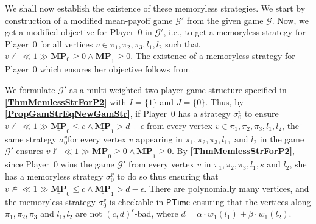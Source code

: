 We shall now establish the existence of these memoryless strategies. 
We start by construction of a modified mean-payoff game $\mathcal{G'}$ from the given game $\mathcal{G}$. Now, we get a modified objective for Player~0 in $\mathcal{G'}$, i.e., to get a memoryless strategy for Player~0 for all vertices $v \in \pi_1, \pi_2, \pi_3, l_1, l_2$ such that $v \nvDash \ll 1 \gg \overline{\mathbf{MP}}_0 \geqslant 0 \land \underline{\mathbf{MP}}_1 \geqslant 0$. The existence of a memoryless strategy for Player~0 which ensures her objective follows from \textbf{}

\noindent We formulate $\mathcal{G'}$ as a multi-weighted two-player game structure specified in \textbf{\cref{ThmMemlessStrForP2}} with $I = \{1\}$ and $J = \{0\}$. 
Thus, by \textbf{\cref{PropGamStrEqNewGamStr}}, if Player~0 has a strategy $\sigma_0^{v}$ to ensure $v \nvDash \ll 1 \gg \underline{\mathbf{MP}}_0 \leqslant c \land \underline{\mathbf{MP}}_1 > d-\epsilon$ from every vertex $v \in \pi_1, \pi_2, \pi_3, l_1, l_2$, the same strategy $\sigma_0^{v}$for every vertex $v$ appearing in $\pi_1, \pi_2, \pi_3, l_1, \text{ and } l_2$ in the game $\mathcal{G'}$ ensures $v \nvDash \ll 1 \gg \underline{\mathbf{MP}}_0 \geqslant 0 \land \underline{\mathbf{MP}}_1 \geqslant 0$. 
By \textbf{\cref{ThmMemlessStrForP2}}, since Player~0 wins the game $\mathcal{G}'$ from every vertex $v$ in $\pi_1, \pi_2, \pi_3, l_1, s \text{ and } l_2$, she has a memoryless strategy $\sigma_0^{v}$ to do so thus ensuring that $v \nvDash \ll 1 \gg \underline{\mathbf{MP}}_0 \leqslant c \land \underline{\mathbf{MP}}_1 > d - \epsilon$. 
There are polynomially many vertices, and the memoryless strategy $\sigma_0^{v}$ is checkable in $\mathsf{PTime}$ ensuring that the vertices along $\pi_1, \pi_2, \pi_3$ and $l_1, l_2$ are not $(c,d)^\epsilon$-bad, where $d = \alpha \cdot w_1(l_1) + \beta \cdot w_1(l_2)$.